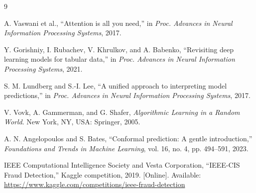 \documentclass[conference]{IEEEtran}
\begin{document}
\begin{thebibliography}{9}

A. Vaswani et al.,
``Attention is all you need,''
in \emph{Proc. Advances in Neural Information Processing Systems}, 2017.

Y. Gorishniy, I. Rubachev, V. Khrulkov, and A. Babenko,
``Revisiting deep learning models for tabular data,''
in \emph{Proc. Advances in Neural Information Processing Systems}, 2021.

S. M. Lundberg and S.-I. Lee,
``A unified approach to interpreting model predictions,''
in \emph{Proc. Advances in Neural Information Processing Systems}, 2017.

V. Vovk, A. Gammerman, and G. Shafer,
\emph{Algorithmic Learning in a Random World}.
New York, NY, USA: Springer, 2005.

A. N. Angelopoulos and S. Bates,
``Conformal prediction: A gentle introduction,''
\emph{Foundations and Trends in Machine Learning},
vol. 16, no. 4, pp. 494--591, 2023.

IEEE Computational Intelligence Society and Vesta Corporation,
``IEEE-CIS Fraud Detection,''
Kaggle competition, 2019. [Online]. Available:
\url{https://www.kaggle.com/competitions/ieee-fraud-detection}

\end{thebibliography}
\end{document}
